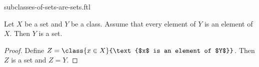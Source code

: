 \documentclass{stex}
\begin{document}
\begin{smodule}{subclasses-of-sets-are-sets.ftl}
  \begin{forthel}
    \begin{lemma}
      Let $X$ be a set and $Y$ be a class.
      Assume that every element of $Y$ is an element of $X$.
      Then $Y$ is a set.
    \end{lemma}
    \begin{proof}
      Define $Z = \class{x \in X}{\text{$x$ is an element of $Y$}}$.
      Then $Z$ is a set and $Z = Y$.
    \end{proof}
  \end{forthel}
\end{smodule}
\end{document}
